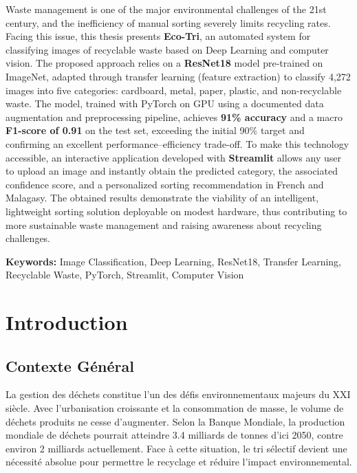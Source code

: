 \documentclass[12pt,a4paper]{report}
\begin{document}
Waste management is one of the major environmental challenges of the 21st century, and the inefficiency of manual sorting severely limits recycling rates. Facing this issue, this thesis presents \textbf{Eco-Tri}, an automated system for classifying images of recyclable waste based on Deep Learning and computer vision. The proposed approach relies on a \textbf{ResNet18} model pre-trained on ImageNet, adapted through transfer learning (feature extraction) to classify 4,272 images into five categories: cardboard, metal, paper, plastic, and non-recyclable waste. The model, trained with PyTorch on GPU using a documented data augmentation and preprocessing pipeline, achieves \textbf{91\% accuracy} and a macro \textbf{F1-score of 0.91} on the test set, exceeding the initial 90\% target and confirming an excellent performance--efficiency trade-off. To make this technology accessible, an interactive application developed with \textbf{Streamlit} allows any user to upload an image and instantly obtain the predicted category, the associated confidence score, and a personalized sorting recommendation in French and Malagasy. The obtained results demonstrate the viability of an intelligent, lightweight sorting solution deployable on modest hardware, thus contributing to more sustainable waste management and raising awareness about recycling challenges.

\vspace{0.5cm}
\textbf{Keywords:} Image Classification, Deep Learning, ResNet18, Transfer Learning, Recyclable Waste, PyTorch, Streamlit, Computer Vision

\chapter{Introduction}

\section{Contexte Général}
La gestion des déchets constitue l'un des défis environnementaux majeurs du XXI siècle. Avec l'urbanisation croissante et la consommation de masse, le volume de déchets produits ne cesse d'augmenter. Selon la Banque Mondiale, la production mondiale de déchets pourrait atteindre 3.4 milliards de tonnes d'ici 2050, contre environ 2 milliards actuellement. Face à cette situation, le tri sélectif devient une nécessité absolue pour permettre le recyclage et réduire l'impact environnemental.
\end{document}
